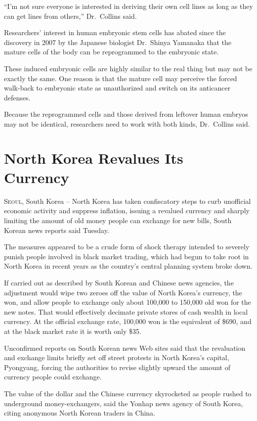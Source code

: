 ﻿\documentclass[12pt]{article}
\begin{document}
``I'm not sure everyone is interested in deriving their own cell lines as long as they can get lines
from others,'' Dr.~Collins said.

Researchers' interest in human embryonic stem cells has abated since the discovery in 2007 by the
Japanese biologist Dr.~Shinya Yamanaka that the mature cells of the body can be reprogrammed to the
embryonic state.

These induced embryonic cells are highly similar to the real thing but may not be exactly the same.
One reason is that the mature cell may perceive the forced walk-back to embryonic state as
unauthorized and switch on its anticancer defenses.

Because the reprogrammed cells and those derived from leftover human embryos may not be identical,
researchers need to work with both kinds, Dr.~Collins said.

\section{North Korea Revalues Its Currency}

\lettrine{S}{eoul}, South Korea -- North Korea has taken confiscatory steps
to curb unofficial economic activity and suppress inflation, issuing a revalued currency and sharply
limiting the amount of old money people can exchange for new bills, South Korean news reports said
Tuesday.

The measures appeared to be a crude form of shock therapy intended to severely punish people
involved in black market trading, which had begun to take root in North Korea in recent years as the
country's central planning system broke down.

If carried out as described by South Korean and Chinese news agencies, the adjustment would wipe two
zeroes off the value of North Korea's currency, the won, and allow people to exchange only about
100,000 to 150,000 old won for the new notes. That would effectively decimate private stores of cash
wealth in local currency. At the official exchange rate, 100,000 won is the equivalent of \$690, and
at the black market rate it is worth only \$35.

Unconfirmed reports on South Korean news Web sites said that the revaluation and exchange limits
briefly set off street protests in North Korea's capital, Pyongyang, forcing the authorities to
revise slightly upward the amount of currency people could exchange.

The value of the dollar and the Chinese currency skyrocketed as people rushed to underground
money-exchangers, said the Yonhap news agency of South Korea, citing anonymous North Korean traders
in China.
\end{document}
